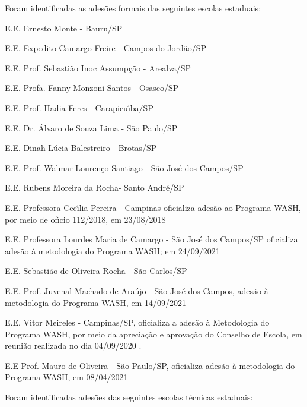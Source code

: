 \documentclass[
12pt,		%
openright,	%
twoside,  %
a4paper,			%
chapter=TITLE,		%
english,			%
french,				%
spanish,			%
brazil				%
]{USPSC-classe/USPSC}
\begin{document}
Foram identificadas as ades\~oes formais das seguintes escolas estaduais:


















\begin{alineas}
\item E.E. Ernesto Monte - Bauru/SP
\item E.E. Expedito Camargo Freire - Campos do Jord\~ao/SP
\item E.E. Prof. Sebasti\~ao Inoc Assump\c{c}\~ao - Arealva/SP
\item E.E. Profa. Fanny Monzoni Santos - Osasco/SP
\item E.E. Prof. Hadia Feres - Carapicu\'{\i}ba/SP
\item E.E. Dr. \'Alvaro de Souza Lima - S\~ao Paulo/SP
\item E.E. Dinah L\'ucia Balestreiro - Brotas/SP  
\item E.E. Prof. Walmar Louren\c{c}o Santiago - S\~ao Jos\'e dos Campos/SP
\item E.E. Rubens Moreira da Rocha- Santo Andr\'e/SP
\item E.E. Professora Cec\'{\i}lia Pereira - Campinas oficializa ades\~ao ao Programa WASH, por meio de of\'{\i}cio 112/2018, em 23/08/2018
\item E.E. Professora Lourdes Maria de Camargo - S\~ao Jos\'e dos Campos/SP oficializa ades\~ao \`a metodologia do Programa WASH; em 24/09/2021
\item E.E. Sebasti\~ao de Oliveira Rocha - S\~ao Carlos/SP
\item E.E. Prof. Juvenal Machado de Ara\'ujo - S\~ao Jos\'e dos Campos, ades\~ao \`a metodologia do Programa WASH, em 14/09/2021
\item E.E. Vitor Meireles - Campinas/SP, oficializa a ades\~ao \`a Metodologia do Programa WASH, por meio da aprecia\c{c}\~ao e aprova\c{c}\~ao do Conselho de Escola, em reuni\~ao realizada no dia  04/09/2020 .
\item E.E Prof. Mauro de Oliveira - S\~ao Paulo/SP, oficializa ades\~ao \`a metodologia do Programa WASH, em 08/04/2021
\end{alineas}

Foram identificadas ades\~oes das seguintes escolas t\'ecnicas estaduais:
\end{document}
